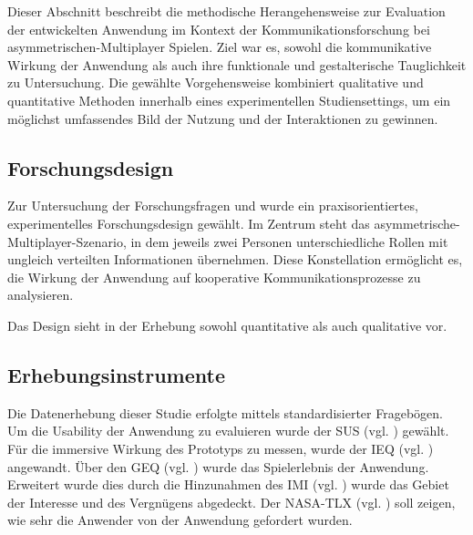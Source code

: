 Dieser Abschnitt beschreibt die methodische Herangehensweise zur Evaluation der entwickelten Anwendung im Kontext der Kommunikationsforschung bei asymmetrischen-Multiplayer Spielen. Ziel war es, sowohl die kommunikative Wirkung der Anwendung als auch ihre funktionale und gestalterische Tauglichkeit zu Untersuchung. Die gewählte Vorgehensweise kombiniert qualitative und quantitative Methoden innerhalb eines experimentellen Studiensettings, um ein möglichst umfassendes Bild der Nutzung und der Interaktionen zu gewinnen.

\subsection{Forschungsdesign}
Zur Untersuchung der Forschungsfragen  und  wurde ein praxisorientiertes, experimentelles Forschungsdesign gewählt. Im Zentrum steht das asymmetrische-Multiplayer-Szenario, in dem jeweils zwei Personen unterschiedliche Rollen mit ungleich verteilten Informationen übernehmen. Diese Konstellation ermöglicht es, die Wirkung der Anwendung auf kooperative Kommunikationsprozesse zu analysieren.

Das Design sieht in der Erhebung sowohl quantitative als auch qualitative vor. 

\subsection{Erhebungsinstrumente}

Die Datenerhebung dieser Studie erfolgte mittels standardisierter Fragebögen.
Um die Usability der Anwendung zu evaluieren wurde der \ac{SUS} (vgl. \cite{brooke_sus_1995}) gewählt. Für die immersive Wirkung des Prototyps zu messen, wurde der \ac{IEQ} (vgl. \cite{jennett_measuring_2008}) angewandt. Über den \ac{GEQ} (vgl. \cite{ijsselsteijn_game_2013}) wurde das Spielerlebnis der Anwendung. Erweitert wurde dies durch die Hinzunahmen des \ac{IMI} (vgl. \cite{mcauley_psychometric_1989}) wurde das Gebiet der Interesse und des Vergnügens abgedeckt. Der \ac{NASA-TLX} (vgl. \cite{hart_nasa-task_2006}) soll zeigen, wie sehr die Anwender von der Anwendung gefordert wurden.

